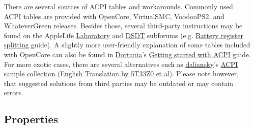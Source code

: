 \documentclass[]{article}
\makeatletter
\renewcommand{\label}[1]{%
\zref@wrapper@immediate{\oldlabel{#1}}}  %
\makeatother
\begin{document}
There are several sources of ACPI tables and workarounds. Commonly used
ACPI tables are provided with OpenCore, VirtualSMC, VoodooPS2, and WhateverGreen
releases. Besides those, several third-party instructions may be found on
the AppleLife \href{https://applelife.ru/forums/xakintosh.67}{Laboratory}
and \href{https://applelife.ru/forums/dsdt.129}{DSDT} subforums
(e.g. \href{https://applelife.ru/posts/498967}{Battery register splitting} guide).
A slightly more user-friendly explanation of some tables included with OpenCore
can also be found in \href{https://dortania.github.io}{Dortania}'s
\href{https://dortania.github.io/Getting-Started-With-ACPI}{Getting started with ACPI} guide.
For more exotic cases, there are several alternatives such as
\href{https://github.com/daliansky}{daliansky}'s
\href{https://github.com/daliansky/OC-little}{ACPI sample collection}
(\href{https://github.com/5T33Z0/OC-Little-Translated}{English Translation by 5T33Z0 et al}).
Please note however, that suggested solutions from third parties may be outdated or may contain errors.

\subsection{Properties}\label{acpiprops}
\end{document}
